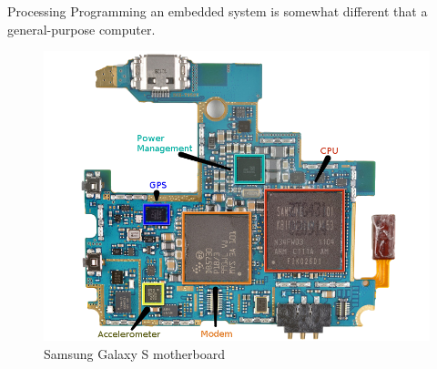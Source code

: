 \documentclass[aspectratio=169]{beamer}
\begin{document}
\begin{frame}[t]{Processing}
\small
Programming an embedded system is somewhat different that a general-purpose computer. \\
\vspace{1em}
\begin{figure}
\includegraphics[width=\textwidth,height=0.6\textheight,keepaspectratio,left]{img/Galaxy_Logic_Board_Edited_2_small_annotated.png}
\captionsetup{justification=raggedright,singlelinecheck=false,labelformat=empty}
\caption{Samsung Galaxy S motherboard}
\end{figure}
\end{frame}
\end{document}
